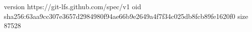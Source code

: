 version https://git-lfs.github.com/spec/v1
oid sha256:63aa9cc307e3657d2984980f94ae66b9e2649a4f7f34c025db8fcb89fe1620f0
size 87528
